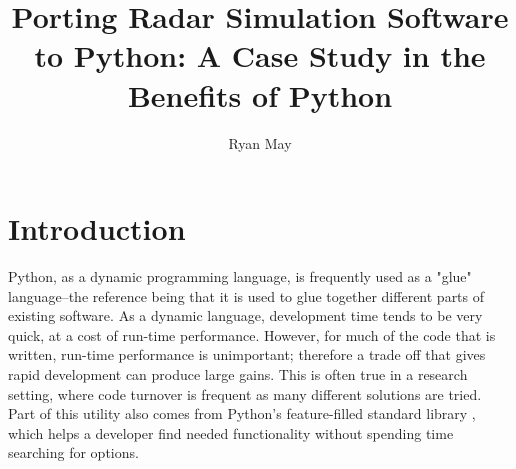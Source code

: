 \documentclass[twocolumn]{article}
\title{Porting Radar Simulation Software to Python: A Case Study in the Benefits of Python}
\author{Ryan May}
\affil{Enterprise Electronics Corporation\\Norman, OK}
\date{}
\begin{document}
\maketitle



\section{Introduction}
Python, as a dynamic programming language, is frequently used as a "glue"
language--the reference being that it is used to glue together different parts
of existing software. As a dynamic language, development time tends to be very
quick, at a cost of run-time performance. However, for much of the code that is
written, run-time performance is unimportant; therefore a trade off that
gives rapid development can produce large gains. This is often true in a research
setting, where code turnover is frequent as many different solutions are tried.
Part of this utility also comes from Python's feature-filled standard library
\cite{pythonlib}, which helps a developer find needed functionality without
spending time searching for options.
\end{document}
